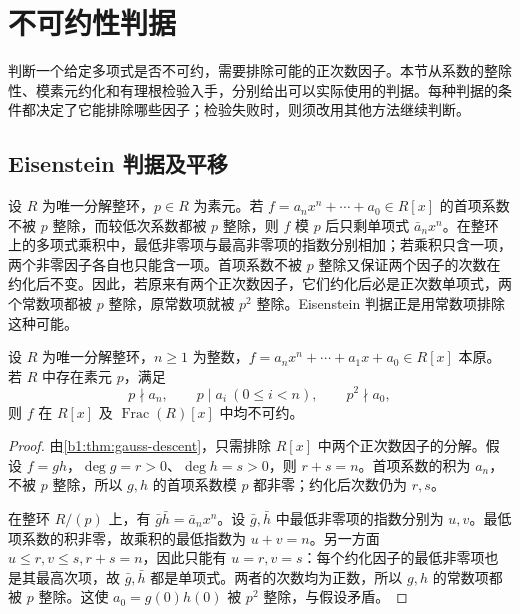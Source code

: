 
\section{不可约性判据}
\label{b1:sec:1203}

%
%

判断一个给定多项式是否不可约，需要排除可能的正次数因子。本节从系数的整除性、模素元约化和有理根检验入手，分别给出可以实际使用的判据。每种判据的条件都决定了它能排除哪些因子；检验失败时，则须改用其他方法继续判断。

\subsection{Eisenstein 判据及平移}
\label{b1:subsec:1203:01}

设 \(R\) 为唯一分解整环，\(p\in R\) 为素元。若 \(f=a_nx^n+\cdots+a_0\in R[x]\) 的首项系数不被 \(p\) 整除，而较低次系数都被 \(p\) 整除，则 \(f\) 模 \(p\) 后只剩单项式 \(\bar a_nx^n\)。在整环上的多项式乘积中，最低非零项与最高非零项的指数分别相加；若乘积只含一项，两个非零因子各自也只能含一项。首项系数不被 \(p\) 整除又保证两个因子的次数在约化后不变。因此，若原来有两个正次数因子，它们约化后必是正次数单项式，两个常数项都被 \(p\) 整除，原常数项就被 \(p^2\) 整除。Eisenstein 判据正是用常数项排除这种可能。

\begin{theorem}[Eisenstein]\label{b1:thm:eisenstein}
	设 \(R\) 为唯一分解整环，\(n\geq1\) 为整数，\(f=a_nx^n+\cdots+a_1x+a_0\in R[x]\) 本原。若 \(R\) 中存在素元 \(p\)，满足
	\[
		p\nmid a_n,\qquad p\mid a_i\ (0\le i<n),\qquad p^2\nmid a_0,
	\]
	则 \(f\) 在 \(R[x]\) 及 \(\operatorname{Frac}(R)[x]\) 中均不可约。
\end{theorem}
\begin{proof}
	由\cref{b1:thm:gauss-descent}，只需排除 \(R[x]\) 中两个正次数因子的分解。假设 \(f=gh\)，\(\deg g=r>0\)、\(\deg h=s>0\)，则 \(r+s=n\)。首项系数的积为 \(a_n\)，不被 \(p\) 整除，所以 \(g,h\) 的首项系数模 \(p\) 都非零；约化后次数仍为 \(r,s\)。

	在整环 \(R/(p)\) 上，有 \(\bar g\bar h=\bar a_nx^n\)。设 \(\bar g,\bar h\) 中最低非零项的指数分别为 \(u,v\)。最低项系数的积非零，故乘积的最低指数为 \(u+v=n\)。另一方面 \(u\le r,v\le s,r+s=n\)，因此只能有 \(u=r,v=s\)：每个约化因子的最低非零项也是其最高次项，故 \(\bar g,\bar h\) 都是单项式。两者的次数均为正数，所以 \(g,h\) 的常数项都被 \(p\) 整除。这使 \(a_0=g(0)h(0)\) 被 \(p^2\) 整除，与假设矛盾。
\end{proof}

